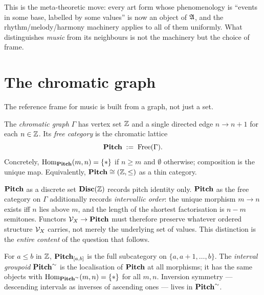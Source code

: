 \begin{remark}
This is the meta-theoretic move: every art form whose phenomenology
is ``events in some base, labelled by some values'' is now an object
of $\mathfrak{A}$, and the rhythm/melody/harmony machinery applies to all
of them uniformly. What distinguishes \emph{music} from its
neighbours is not the machinery but the choice of frame.
\end{remark}

\section{The chromatic graph}

The reference frame for music is built from a graph, not just a set.

\begin{definition}\label{def:chromatic}
The \emph{chromatic graph} $\Gamma$ has vertex set $\mathbb{Z}$ and a single
directed edge $n \to n{+}1$ for each $n \in \mathbb{Z}$. Its \emph{free
category} is the chromatic lattice
\[
\mathbf{Pitch} \;:=\; \mathrm{Free}(\Gamma).
\]
Concretely, $\mathrm{Hom}_{\mathbf{Pitch}}(m, n) = \{*\}$ if $n \geq m$ and
$\emptyset$ otherwise; composition is the unique map. Equivalently,
$\mathbf{Pitch} \cong (\mathbb{Z}, \leq)$ as a thin category.
\end{definition}

\begin{remark}
$\mathbf{Pitch}$ as a discrete set $\mathbf{Disc}(\mathbb{Z})$ records pitch identity only.
$\mathbf{Pitch}$ as the free category on $\Gamma$ additionally records
\emph{intervallic order}: the unique morphism $m \to n$ exists iff $n$
lies above $m$, and the length of the shortest factorisation is
$n - m$ semitones. Functors $\mathcal{V}_X \to \mathbf{Pitch}$ must therefore preserve
whatever ordered structure $\mathcal{V}_X$ carries, not merely the underlying
set of values. This distinction is the \emph{entire content} of the
question that follows.
\end{remark}

\begin{definition}
For $a \leq b$ in $\mathbb{Z}$, $\mathbf{Pitch}_{[a,b]}$ is the full subcategory on
$\{a, a{+}1, \ldots, b\}$. The \emph{interval groupoid}
$\mathbf{Pitch}^\sim$ is the localisation of $\mathbf{Pitch}$ at all morphisms; it
has the same objects with $\mathrm{Hom}_{\mathbf{Pitch}^\sim}(m, n) = \{*\}$
for all $m, n$. Inversion symmetry — descending intervals as
inverses of ascending ones — lives in $\mathbf{Pitch}^\sim$.
\end{definition}

